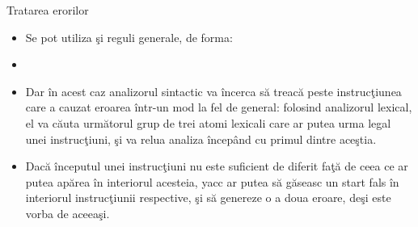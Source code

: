 \documentclass[pdf]{beamer}
\begin{document}
\begin{frame}{Tratarea erorilor}
\begin{itemize}
	\item
	Se pot utiliza şi reguli generale, de forma:

	\item[]

	\item
	Dar în acest caz analizorul sintactic va încerca să treacă peste instrucţiunea care a cauzat eroarea într-un mod la fel de general: folosind analizorul lexical, el va căuta următorul grup de trei atomi lexicali care ar putea urma legal unei instrucţiuni, şi va relua analiza începând cu primul dintre aceştia.

	\item
	Dacă începutul unei instrucţiuni nu este suficient de diferit faţă de ceea ce ar putea apărea în interiorul acesteia, yacc ar putea să găseasc un start fals în interiorul instrucţiunii respective, şi să genereze o a doua eroare, deşi este vorba de aceeaşi.

\end{itemize}
\end{frame}
\end{document}
